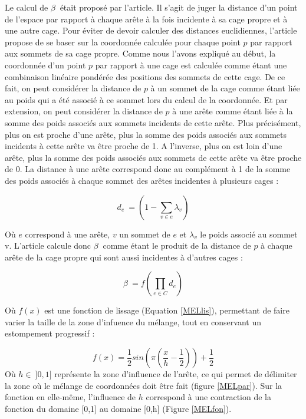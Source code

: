 Le calcul de $\beta~$ était proposé par l'article. Il s'agit de juger
la distance d'un point de l'espace par rapport à chaque arête à la
fois incidente à sa cage propre et à une autre cage. Pour éviter de
devoir calculer des distances euclidiennes, l'article propose de se
baser sur la coordonnée calculée pour chaque point $p$ par rapport aux
sommets de sa cage propre. Comme nous l'avons expliqué au début, la
coordonnée d'un point $p$ par rapport à une cage est calculée comme
étant une combinaison linéaire pondérée des positions des sommets de
cette cage. De ce fait, on peut considérer la distance de $p$ à un
sommet de la cage comme étant liée au poids qui a été associé à ce
sommet lors du calcul de la coordonnée. Et par extension, on peut
considérer la distance de $p$ à une arête comme étant liée à la somme
des poids associés aux sommets incidents de cette arête. Plus
précisément, plus on est proche d'une arête, plus la somme des poids
associés aux sommets incidents à cette arête va être proche de 1. A
l'inverse, plus on est loin d'une arête, plus la somme des poids
associés aux sommets de cette arête va être proche de 0. La distance à
une arête correspond donc au complément à 1 de la somme des poids
associés à chaque sommet des arêtes incidentes à plusieurs cages :

\begin{equation}
  d_e~ = (1 - \sum_{v \in e} \lambda_v)
\end{equation}

Où $e$ correspond à une arête, $v$ un sommet de $e$ et $\lambda_v$ le
poids associé au sommet v. L'article calcule donc $\beta~$ comme étant
le produit de la distance de $p$ à chaque arête de la cage propre qui
sont aussi incidentes à d'autres cages :

\begin{equation}
  \beta~ = f(\prod_{e \in C} d_e)
\end{equation}

Où $f(x)$ est une fonction de lissage (Equation \ref{MELlis}),
permettant de faire varier la taille de la zone d'infuence du mélange,
tout en conservant un estompement progressif :

\begin{equation}
  f(x) = \frac{1}{2} sin(\pi(\frac{x}{h}-\frac{1}{2})) + \frac{1}{2}
  \label{MELlis}
\end{equation}
Où $h \in~ ]0,1]$ représente la zone d'influence de l'arête, ce qui
permet de délimiter la zone où le mélange de coordonnées doit être
fait (figure \ref{MELpar}). Sur la fonction en elle-même, l'influence
de $h$ correspond à une contraction de la fonction du domaine [0,1] au
domaine [0,h] (Figure \ref{MELfon}).

